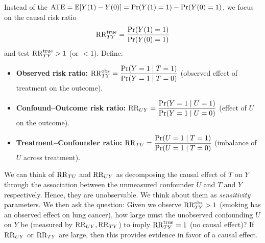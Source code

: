 \documentclass[11pt]{exam}
\begin{document}
Instead of the $\mathrm{ATE} = \mathbb{E}[Y(1) - Y(0)] = \Pr(Y(1) = 1) - \Pr(Y(0) = 1)$, we focus on the causal risk ratio
\[
   \mathrm{RR}^{\mathrm{true}}_{TY}   = \frac{\Pr(Y(1) = 1)}{\Pr(Y(0) = 1)}
\]
and test $\mathrm{RR}^{\text{true}}_{TY}>1$ (or $<1$). Define:
\begin{itemize}
  \item \textbf{Observed risk ratio:}\;
  $\mathrm{RR}^{\mathrm{obs}}_{TY}=\dfrac{\Pr(Y=1\mid T=1)}{\Pr(Y=1\mid T=0)}$ (observed effect of treatment on the outcome).
  \item \textbf{Confound--Outcome risk ratio:}\;
  $\mathrm{RR}_{UY}=\dfrac{\Pr(Y=1\mid U=1)}{\Pr(Y=1\mid U=0)}$ (effect of $U$ on the outcome).
  \item \textbf{Treatment--Confounder ratio:}\;
  $\mathrm{RR}_{TU}=\dfrac{\Pr(U=1\mid T=1)}{\Pr(U=1\mid T=0)}$ (imbalance of $U$ across treatment).
\end{itemize}
We can think of $\mathrm{RR}_{TU}$ and $\mathrm{RR}_{UY}$ as decomposing the causal effect of $T$ on $Y$ through the association between the unmeasured confounder $U$ and $T$ and $Y$ respectively. Hence, they are unobservable. We think about them as \emph{sensitivity} parameters. 
We then ask the question: Given we observe $\mathrm{RR}^{\mathrm{obs}}_{TY} > 1$ (smoking has an observed effect on lung cancer), how large must the unobserved confounding $U$ on $Y$ be (measured by $\mathrm{RR}_{UY}, \mathrm{RR}_{TY}$) to imply $\mathrm{RR}^{\mathrm{true}}_{TY} = 1$ (no causal effect)? If $\mathrm{RR}_{UY}$ or $\mathrm{RR}_{TY}$ are large, then this provides evidence in favor of a causal effect.
\end{document}

